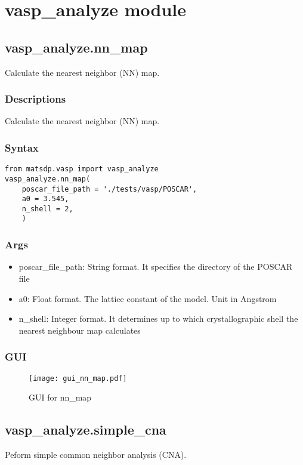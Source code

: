 \documentclass[12pt]{book}
\begin{document}
\section{vasp\_analyze module}
\subsection{vasp\_analyze.nn\_map}
Calculate the nearest neighbor (NN) map.

\subsubsection{Descriptions}
Calculate the nearest neighbor (NN) map.
\subsubsection{Syntax}
\begin{lstlisting}
from matsdp.vasp import vasp_analyze
vasp_analyze.nn_map(
    poscar_file_path = './tests/vasp/POSCAR',
    a0 = 3.545,
    n_shell = 2,
    )
\end{lstlisting}
\subsubsection{Args}
\begin{itemize}
\item poscar\_file\_path: String format. It specifies the directory of the POSCAR file
\item a0: Float format. The lattice constant of the model. Unit in Angstrom
\item n\_shell: Integer format. It determines up to which crystallographic shell the nearest neighbour map calculates
 \end{itemize}

\subsubsection{GUI}
\begin{figure}[htbp]
\centering
\texttt{[image: gui\_nn\_map.pdf]}
\caption{GUI for nn\_map}
\label{fig:GUI_NN_map}
\end{figure}

\subsection{vasp\_analyze.simple\_cna}
Peform simple common neighbor analysis (CNA).
\end{document}

